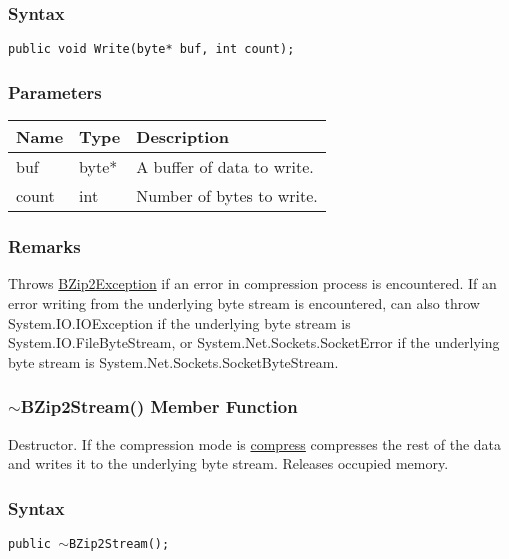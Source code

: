 \documentclass[a4paper,oneside,11.000000pt]{book}
\begin{document}
\subsubsection*{Syntax}\texttt{public void Write(byte* buf, int count);}

\subsubsection*{Parameters}
\begin{flushleft}
\begin{supertabular}[l]{lll}
\textbf{Name}
& \textbf{Type}
& \textbf{Description}
\\
\hline
buf
& byte*
& A buffer of data to write.

\\
count
& int
& Number of bytes to write.

\\
\end{supertabular}

\end{flushleft}
\subsubsection*{Remarks}
\begin{flushleft}
Throws \hyperlink{System.IO.Compression.BZip2Exception}{BZip2Exception} if an error in compression process is encountered.
If an error writing from the underlying byte stream is encountered, 
can also throw System.\-IO.\-IOException if the underlying byte stream is System.\-IO.\-FileByteStream, or
System.\-Net.\-Sockets.\-SocketError if the underlying byte stream is System.\-Net.\-Sockets.\-SocketByteStream.

\end{flushleft}
\clearpage

\hypertarget{System.IO.Compression.BZip2Stream.destructor.P.System.IO.Compression.BZip2Stream}{\subsubsection*{$\sim$BZip2Stream() Member Function}}
\begin{flushleft}
Destructor. If the compression mode is \hyperlink{System.IO.Compression.CompressionMode.compress}{compress} compresses the rest of the data
and writes it to the underlying byte stream. Releases occupied memory.

\end{flushleft}
\subsubsection*{Syntax}\texttt{public $\sim$BZip2Stream();}
\clearpage
\end{document}
